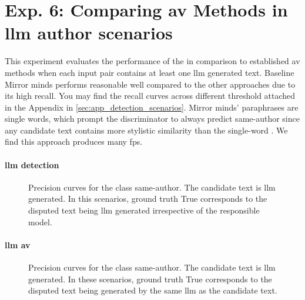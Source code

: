 \section{Exp. 6: Comparing \ac{av} Methods in \acs{llm} author scenarios}

This experiment evaluates the performance of the \impAppr{} in comparison to established \ac{av} methods when each input pair contains at least one \ac{llm} generated text.
Baseline Mirror minds performs reasonable well compared to the other approaches due to its high recall.
You may find the recall curves across different threshold attached in the Appendix in \autoref{sec:app_detection_scenarios}.
Mirror minds' paraphrases are single words, which prompt the discriminator to always predict same-author since any candidate text contains more stylistic similarity than the single-word \imps{}.
We find this approach produces many \acp{fp}.


\paragraph{\ac{llm} detection}


\begin{figure}[b]
  
\caption{Precision curves for the class same-author. 
The candidate text is \ac{llm} generated.
In this scenarios, ground truth True corresponds to the disputed text being \ac{llm} generated irrespective of the responsible model.
}
\label{fig:llm_detection_prec}
\end{figure}

\paragraph{\ac{llm} \ac{av}}

\begin{figure}[b]
  \centering
  
  \caption{Precision curves for the class same-author. 
The candidate text is \ac{llm} generated.
In these scenarios, ground truth True corresponds to the disputed text being generated by the same \ac{llm} as the candidate text.
}
  \label{fig:llm_av_prec}
\end{figure}




